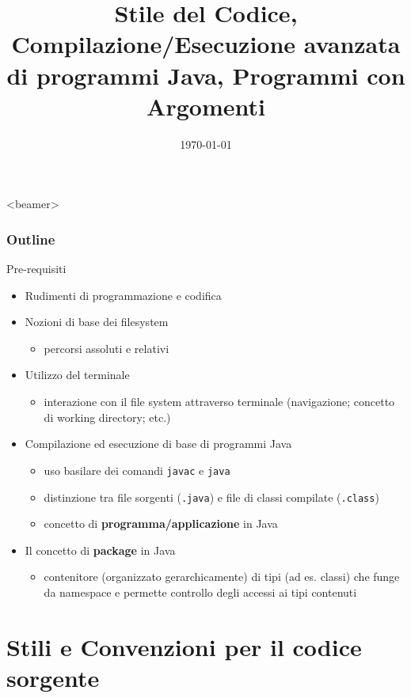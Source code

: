 \documentclass[xcolor=dvipsnames,presentation]{beamer}
\title[{\lab} -- Strumenti Avanzati]{Stile del Codice, Compilazione/Esecuzione avanzata di programmi Java, Programmi con Argomenti}
\date[\today]{\today}
\begin{document}
\frame[label=coverpage]{\titlepage}

\begin{frame}<beamer>
	\frametitle{Outline}
	\tableofcontents[]
\end{frame}

\begin{frame}{Pre-requisiti}
\begin{itemize}
\item Rudimenti di programmazione e codifica
\item Nozioni di base dei filesystem
	\begin{itemize}
	\item percorsi assoluti e relativi
	\end{itemize}
\item Utilizzo del terminale
	\begin{itemize}
	\item interazione con il file system attraverso terminale (navigazione; concetto di working directory; etc.)
	\end{itemize}
\item Compilazione ed esecuzione di base di programmi Java
	\begin{itemize}
	\item uso basilare dei comandi \texttt{javac} e \texttt{java}
	\item distinzione tra file sorgenti (\texttt{.java}) e file di classi compilate (\texttt{.class})
	\item concetto di \textbf{programma/applicazione} in Java
	\end{itemize}
\item Il concetto di \textbf{package} in Java
	\begin{itemize}
	\item contenitore (organizzato gerarchicamente) di tipi (ad es. classi) che funge da namespace e permette controllo degli accessi ai tipi contenuti
	\end{itemize}
\end{itemize}
\end{frame}

\section{Stili e Convenzioni per il codice sorgente}
\end{document}
